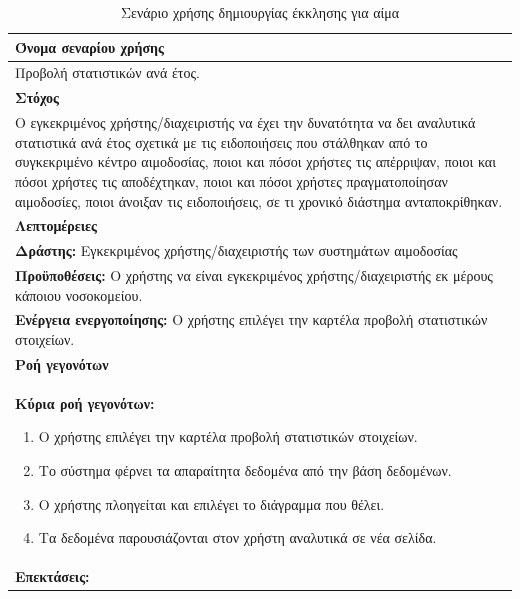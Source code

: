 \begin{table}[H]
	\begin{center}
	    \begin{tabular}{|p{\dimexpr \linewidth-2\tabcolsep}|}
	    \hline
	    \rowcolor{grayy}
	    \textbf{Όνομα σεναρίου χρήσης}
	    \\ \hline    
	    Προβολή στατιστικών ανά έτος.
	     \\ \hline
	    \rowcolor{grayy}
	    \textbf{\textbf{Στόχος}}
	    \\ \hline
	 	 Ο εγκεκριμένος χρήστης/διαχειριστής να έχει την δυνατότητα να δει αναλυτικά στατιστικά ανά έτος σχετικά με τις ειδοποιήσεις που στάλθηκαν από το συγκεκριμένο κέντρο αιμοδοσίας, ποιοι και πόσοι χρήστες τις απέρριψαν, ποιοι και πόσοι χρήστες τις αποδέχτηκαν, ποιοι και πόσοι χρήστες πραγματοποίησαν αιμοδοσίες, ποιοι άνοιξαν τις ειδοποιήσεις, σε τι χρονικό διάστημα ανταποκρίθηκαν.
	    \\ \hline
	    \rowcolor{grayy}
	    \textbf{Λεπτομέρειες}
	    \\ \hline
		\textbf{Δράστης:} Εγκεκριμένος χρήστης/διαχειριστής των συστημάτων αιμοδοσίας
		\\*
		\textbf{Προϋποθέσεις:} Ο χρήστης να είναι εγκεκριμένος χρήστης/διαχειριστής εκ μέρους κάποιου νοσοκομείου.
		\\*
		\textbf{Ενέργεια ενεργοποίησης:} Ο χρήστης επιλέγει την καρτέλα προβολή στατιστικών στοιχείων.
		\\ \hline
		\rowcolor{grayy}    
	    \textbf{Ροή γεγονότων}
	    \\ \hline
		\textbf{Κύρια ροή γεγονότων:}
		\begin{enumerate}
		\item	 Ο χρήστης επιλέγει την καρτέλα προβολή στατιστικών στοιχείων.
		\item Το σύστημα φέρνει τα απαραίτητα δεδομένα από την βάση δεδομένων.
		\item Ο χρήστης πλοηγείται και επιλέγει το διάγραμμα που θέλει.
		\item Τα δεδομένα παρουσιάζονται στον χρήστη αναλυτικά  σε νέα σελίδα.
		\end{enumerate}
		\\ \hline
		\rowcolor{grayy}
		\textbf{Επεκτάσεις:}
		   \\ \hline
	    \end{tabular}
	    \caption{Σενάριο χρήσης δημιουργίας έκκλησης για αίμα}
	    \label{tab:view_year_statistics} 
	\end{center}
\end{table}

